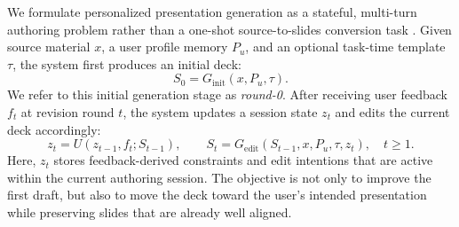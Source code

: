 \documentclass{llmxive}
\begin{document}


We formulate personalized presentation generation as a stateful, multi-turn authoring problem rather than a one-shot source-to-slides conversion task
\citep{sun2021d2s,zheng2025pptagent,zeng2025slidetailor,zheng2026deeppresenter}.
Given source material $x$, a user profile memory $P_u$, and an optional task-time template $\tau$, the system first produces an initial deck:
\begin{equation}
S_0 = G_{\mathrm{init}}(x, P_u, \tau).
\end{equation}
We refer to this initial generation stage as \emph{round-0}. After receiving user feedback $f_t$ at revision round $t$, the system updates a session state
$z_t$ and edits the current deck accordingly:
\begin{equation}
z_t = U(z_{t-1}, f_t; S_{t-1}), \qquad
S_t = G_{\mathrm{edit}}(S_{t-1}, x, P_u, \tau, z_t), \quad t \ge 1.
\end{equation}
Here, $z_t$ stores feedback-derived constraints and edit intentions that are active within the current authoring session. The objective is not only to improve the first draft, but also to move the deck toward the user's intended presentation while preserving slides that are already well aligned.
\end{document}
